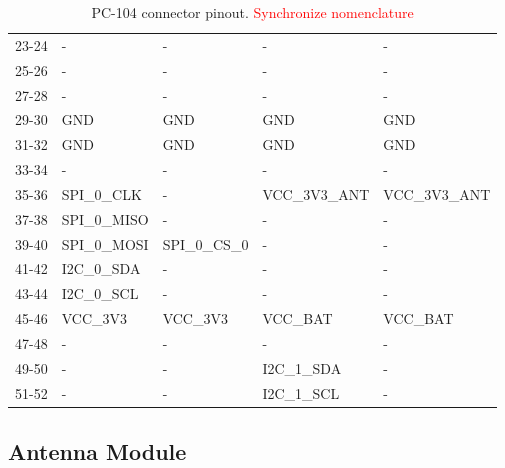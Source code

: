 \begin{table}[!h]
\begin{tabular}{cllll}
        23-24              & -                & -                & -             & -             \\
        25-26              & -                & -                & -             & -             \\
        27-28              & -                & -                & -             & -             \\
        29-30              & GND              & GND              & GND           & GND           \\
        31-32              & GND              & GND              & GND           & GND           \\
        33-34              & -                & -                & -             & -             \\
        35-36              & SPI\_0\_CLK      & -                & VCC\_3V3\_ANT & VCC\_3V3\_ANT \\
        37-38              & SPI\_0\_MISO     & -                & -             & -             \\
        39-40              & SPI\_0\_MOSI     & SPI\_0\_CS\_0    & -             & -             \\
        41-42              & I2C\_0\_SDA      & -                & -             & -             \\
        43-44              & I2C\_0\_SCL      & -                & -             & -             \\
        45-46              & VCC\_3V3         & VCC\_3V3         & VCC\_BAT      & VCC\_BAT      \\
        47-48              & -                & -                & -             & -             \\
        49-50              & -                & -                & I2C\_1\_SDA   & -             \\
        51-52              & -                & -                & I2C\_1\_SCL   & -             \\
        \bottomrule[1.5pt]
    \end{tabular}
    \caption{PC-104 connector pinout. \textcolor{red}{Synchronize nomenclature}}
    \label{tab:pc104-pins}
\end{table}

\subsection{Antenna Module}

